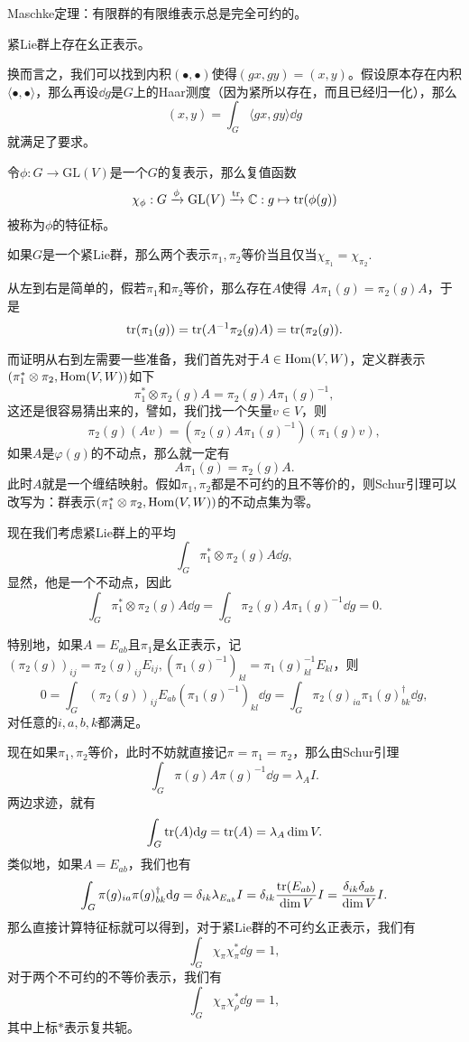 \theo Maschke定理：有限群的有限维表示总是完全可约的。 

\pro 紧Lie群上存在幺正表示。

换而言之，我们可以找到内积$(\bullet,\bullet)$使得$(gx,gy)=(x,y)$。假设原本存在内积$\langle \bullet,\bullet \rangle$，那么再设$\dd g$是$G$上的Haar测度（因为紧所以存在，而且已经归一化），那么
\[
	(x,y)=\int_G \langle gx,gy \rangle \dd g
\]
就满足了要求。


\para
	令$\phi:G\to \mathrm{GL}(V)$是一个$G$的复表示，那么复值函数
	\[
	\chi_\phi:G\xrightarrow{\phi}\mathrm{GL}(V)\xrightarrow{\operatorname{tr}}\mathbb{C}:g\mapsto \operatorname{tr}(\phi(g))
	\]
	被称为$\phi$的特征标。

\pro 如果$G$是一个紧Lie群，那么两个表示$\pi_1,\pi_2$等价当且仅当$\chi_{\pi_1}=\chi_{\pi_2}$.

从左到右是简单的，假若$\pi_1$和$\pi_2$等价，那么存在$A$使得
$A\pi_1(g)=\pi_2(g)A$，于是
\[
	\operatorname{tr}(\pi_1(g))=\operatorname{tr}(A^{-1}\pi_2(g)A)=\operatorname{tr}(\pi_2(g)).
\]

而证明从右到左需要一些准备，我们首先对于$A\in \operatorname{Hom}(V,W)$，定义群表示$(\pi_1^*\otimes\pi_2,\operatorname{Hom}(V,W))$如下
\[
	\pi_1^*\otimes\pi_2(g)A=\pi_2(g)A\pi_1(g)^{-1},
\]
这还是很容易猜出来的，譬如，我们找一个矢量$v\in V$，则
\[
	\pi_2(g)(Av)=(\pi_2(g)A\pi_1(g)^{-1})(\pi_1(g)v),
\]
如果$A$是$\varphi(g)$的不动点，那么就一定有
\[
	A\pi_1(g)=\pi_2(g)A.
\]
此时$A$就是一个缠结映射。假如$\pi_1,\pi_2$都是不可约的且不等价的，则Schur引理可以改写为：群表示$(\pi_1^*\otimes\pi_2,\operatorname{Hom}(V,W))$的不动点集为零。

现在我们考虑紧Lie群上的平均
\[
	\int_G \pi_1^*\otimes\pi_2(g)A \dd g,
\]
显然，他是一个不动点，因此
\[
	\int_G \pi_1^*\otimes\pi_2(g)A \dd g=\int_G \pi_2(g)A\pi_1(g)^{-1}\dd g=0.
\]

特别地，如果$A=E_{ab}$且$\pi_1$是幺正表示，记$(\pi_2(g))_{ij}=\pi_2(g)_{ij}E_{ij},\left(\pi_1(g)^{-1}\right)_{kl}=\pi_1(g)^{-1}_{kl}E_{kl}$，则
\[
0=\int_G (\pi_2(g))_{ij}E_{ab}\left(\pi_1(g)^{-1}\right)_{kl}\dd g=\int_G \pi_2(g)_{ia}\pi_1(g)^{\dag}_{bk}\dd g,
\]
对任意的$i,a,b,k$都满足。

现在如果$\pi_1,\pi_2$等价，此时不妨就直接记$\pi=\pi_1=\pi_2$，那么由Schur引理
\[
	\int_G \pi(g)A\pi(g)^{-1}\dd g=\lambda_A I.
\]
两边求迹，就有
\[
	\int_G \operatorname{tr}(A)\mathrm{d} g=\operatorname{tr}(A)=\lambda_A \dim V.
\]
类似地，如果$A=E_{ab}$，我们也有
\[
	\int_G \pi(g)_{ia}\pi(g)^{\dag}_{bk}\mathrm{d} g=\delta_{ik}\lambda_{E_{ab}} I=\delta_{ik}\frac{\operatorname{tr}(E_{ab})}{\dim V}I=\frac{\delta_{ik}\delta_{ab}}{\dim V}I.
\]
那么直接计算特征标就可以得到，对于紧Lie群的不可约幺正表示，我们有
\[
	\int_G \chi_\pi \chi_\pi^*\dd g=1,
\]
对于两个不可约的不等价表示，我们有
\[
	\int_G \chi_\pi \chi_\rho^*\dd g=1,
\]
其中上标$*$表示复共轭。

